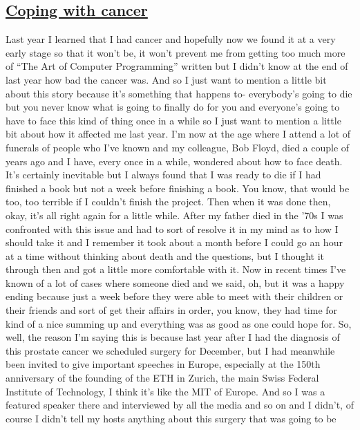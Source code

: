 \documentclass[]{article}
\begin{document}
\subsection{\texorpdfstring{\href{http://webofstories.com/play/17144}{Coping
with cancer}}{Coping with cancer}}\label{coping-with-cancer}

Last year I learned that I had cancer and hopefully now we found it at a
very early stage so that it won't be, it won't prevent me from getting
too much more of ``The Art of Computer Programming'' written but I
didn't know at the end of last year how bad the cancer was. And so I
just want to mention a little bit about this story because it's
something that happens to- everybody's going to die but you never know
what is going to finally do for you and everyone's going to have to face
this kind of thing once in a while so I just want to mention a little
bit about how it affected me last year. I'm now at the age where I
attend a lot of funerals of people who I've known and my colleague, Bob
Floyd, died a couple of years ago and I have, every once in a while,
wondered about how to face death. It's certainly inevitable but I always
found that I was ready to die if I had finished a book but not a week
before finishing a book. You know, that would be too, too terrible if I
couldn't finish the project. Then when it was done then, okay, it's all
right again for a little while. After my father died in the '70s I was
confronted with this issue and had to sort of resolve it in my mind as
to how I should take it and I remember it took about a month before I
could go an hour at a time without thinking about death and the
questions, but I thought it through then and got a little more
comfortable with it. Now in recent times I've known of a lot of cases
where someone died and we said, oh, but it was a happy ending because
just a week before they were able to meet with their children or their
friends and sort of get their affairs in order, you know, they had time
for kind of a nice summing up and everything was as good as one could
hope for. So, well, the reason I'm saying this is because last year
after I had the diagnosis of this prostate cancer we scheduled surgery
for December, but I had meanwhile been invited to give important
speeches in Europe, especially at the 150th anniversary of the founding
of the ETH in Zurich, the main Swiss Federal Institute of Technology, I
think it's like the MIT of Europe. And so I was a featured speaker there
and interviewed by all the media and so on and I didn't, of course I
didn't tell my hosts anything about this surgery that was going to be
\end{document}

